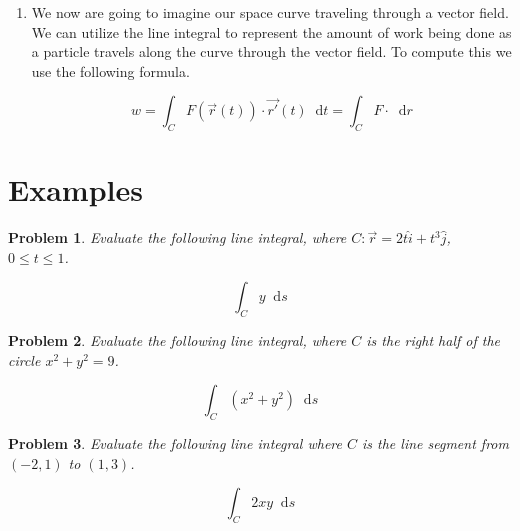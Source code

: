 \documentclass[11pt]{article}
\newtheorem{problem}{Problem}
\newcommand*\dif{\mathop{}\!\mathrm{d}}
\begin{document}
\begin{enumerate}
\begin{equation*}
    \int_{t=a}^{t=b} |\vec{r'}(t)| \dif{t} = \text{arc length!}
\end{equation*}

\item We now are going to imagine our space curve traveling through a vector field. We can utilize the line integral to represent the amount of work being done as a particle travels along the curve through the vector field. To compute this we use the following formula.

\begin{equation*}
    w = \int_C F(\vec{r}(t)) \cdot \vec{r'}(t) \dif{t} = \int_C F \cdot \dif{r}
\end{equation*}

\end{enumerate}




\section{Examples}

\begin{problem}
    Evaluate the following line integral, where $C: \vec{r} = 2t\hat{i}+t^3\hat{j}$, $0\leq t\leq 1$.

    \begin{equation*}
        \int_C y \dif{s}
    \end{equation*}
\end{problem}

\vspace{8cm}


\begin{problem}
    Evaluate the following line integral, where $C$ is the right half of the circle $x^2+y^2=9$.

    \begin{equation*}
        \int_C (x^2+y^2) \dif{s}
    \end{equation*}
\end{problem}

\vspace{7cm}


\begin{problem}
    Evaluate the following line integral where $C$ is the line segment from $(-2,1)$ to $(1,3)$.

    \begin{equation*}
        \int_C 2xy \dif{s}
    \end{equation*}
\end{problem}
\end{document}
